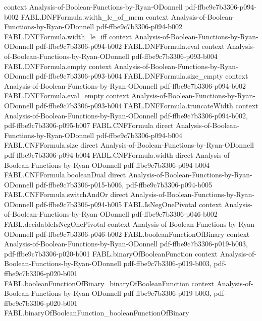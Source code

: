 \begin{theorem}
  {context}
  {Analysis-of-Boolean-Functions-by-Ryan-ODonnell}
  {pdf-ffbe9c7b3306-p094-b002}
\proofstep
  {FABL.DNFFormula.width_le_of_mem}
  {context}
  {Analysis-of-Boolean-Functions-by-Ryan-ODonnell}
  {pdf-ffbe9c7b3306-p094-b002}
\proofstep
  {FABL.DNFFormula.width_le_iff}
  {context}
  {Analysis-of-Boolean-Functions-by-Ryan-ODonnell}
  {pdf-ffbe9c7b3306-p094-b002}
\proofstep
  {FABL.DNFFormula.eval}
  {context}
  {Analysis-of-Boolean-Functions-by-Ryan-ODonnell}
  {pdf-ffbe9c7b3306-p093-b004}
\proofstep
  {FABL.DNFFormula.empty}
  {context}
  {Analysis-of-Boolean-Functions-by-Ryan-ODonnell}
  {pdf-ffbe9c7b3306-p093-b004}
\proofstep
  {FABL.DNFFormula.size_empty}
  {context}
  {Analysis-of-Boolean-Functions-by-Ryan-ODonnell}
  {pdf-ffbe9c7b3306-p094-b002}
\proofstep
  {FABL.DNFFormula.eval_empty}
  {context}
  {Analysis-of-Boolean-Functions-by-Ryan-ODonnell}
  {pdf-ffbe9c7b3306-p093-b004}
\proofstep
  {FABL.DNFFormula.truncateWidth}
  {context}
  {Analysis-of-Boolean-Functions-by-Ryan-ODonnell}
  {pdf-ffbe9c7b3306-p094-b002,
    pdf-ffbe9c7b3306-p095-b007}
\proofstep
  {FABL.CNFFormula}
  {direct}
  {Analysis-of-Boolean-Functions-by-Ryan-ODonnell}
  {pdf-ffbe9c7b3306-p094-b004}
\proofstep
  {FABL.CNFFormula.size}
  {direct}
  {Analysis-of-Boolean-Functions-by-Ryan-ODonnell}
  {pdf-ffbe9c7b3306-p094-b004}
\proofstep
  {FABL.CNFFormula.width}
  {direct}
  {Analysis-of-Boolean-Functions-by-Ryan-ODonnell}
  {pdf-ffbe9c7b3306-p094-b004}
\proofstep
  {FABL.CNFFormula.booleanDual}
  {direct}
  {Analysis-of-Boolean-Functions-by-Ryan-ODonnell}
  {pdf-ffbe9c7b3306-p015-b006,
    pdf-ffbe9c7b3306-p094-b005}
\proofstep
  {FABL.CNFFormula.switchAndOr}
  {direct}
  {Analysis-of-Boolean-Functions-by-Ryan-ODonnell}
  {pdf-ffbe9c7b3306-p094-b005}
\proofstep
  {FABL.IsNegOnePivotal}
  {context}
  {Analysis-of-Boolean-Functions-by-Ryan-ODonnell}
  {pdf-ffbe9c7b3306-p046-b002}
\proofstep
  {FABL.decidableIsNegOnePivotal}
  {context}
  {Analysis-of-Boolean-Functions-by-Ryan-ODonnell}
  {pdf-ffbe9c7b3306-p046-b002}
\proofstep
  {FABL.booleanFunctionOfBinary}
  {context}
  {Analysis-of-Boolean-Functions-by-Ryan-ODonnell}
  {pdf-ffbe9c7b3306-p019-b003,
    pdf-ffbe9c7b3306-p020-b001}
\proofstep
  {FABL.binaryOfBooleanFunction}
  {context}
  {Analysis-of-Boolean-Functions-by-Ryan-ODonnell}
  {pdf-ffbe9c7b3306-p019-b003,
    pdf-ffbe9c7b3306-p020-b001}
\proofstep
  {FABL.booleanFunctionOfBinary_binaryOfBooleanFunction}
  {context}
  {Analysis-of-Boolean-Functions-by-Ryan-ODonnell}
  {pdf-ffbe9c7b3306-p019-b003,
    pdf-ffbe9c7b3306-p020-b001}
\proofstep
  {FABL.binaryOfBooleanFunction_booleanFunctionOfBinary}

\end{theorem}

